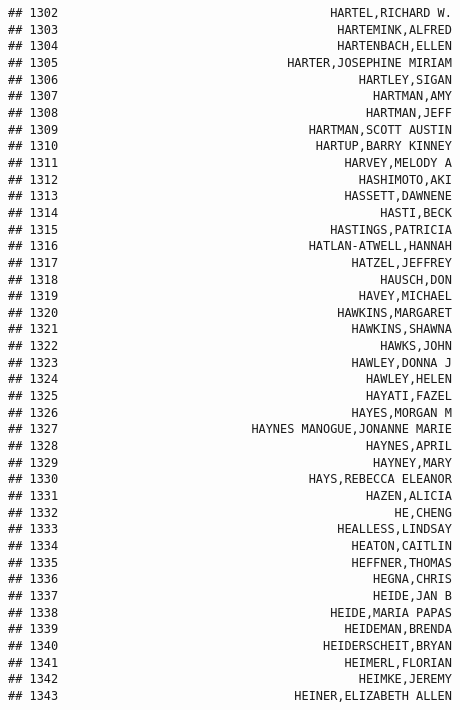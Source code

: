 \documentclass[
]{article}
\begin{document}
\begin{verbatim}
## 1302                                      HARTEL,RICHARD W.
## 1303                                       HARTEMINK,ALFRED
## 1304                                       HARTENBACH,ELLEN
## 1305                                HARTER,JOSEPHINE MIRIAM
## 1306                                          HARTLEY,SIGAN
## 1307                                            HARTMAN,AMY
## 1308                                           HARTMAN,JEFF
## 1309                                   HARTMAN,SCOTT AUSTIN
## 1310                                    HARTUP,BARRY KINNEY
## 1311                                        HARVEY,MELODY A
## 1312                                          HASHIMOTO,AKI
## 1313                                        HASSETT,DAWNENE
## 1314                                             HASTI,BECK
## 1315                                      HASTINGS,PATRICIA
## 1316                                   HATLAN-ATWELL,HANNAH
## 1317                                         HATZEL,JEFFREY
## 1318                                             HAUSCH,DON
## 1319                                          HAVEY,MICHAEL
## 1320                                       HAWKINS,MARGARET
## 1321                                         HAWKINS,SHAWNA
## 1322                                             HAWKS,JOHN
## 1323                                         HAWLEY,DONNA J
## 1324                                           HAWLEY,HELEN
## 1325                                           HAYATI,FAZEL
## 1326                                         HAYES,MORGAN M
## 1327                           HAYNES MANOGUE,JONANNE MARIE
## 1328                                           HAYNES,APRIL
## 1329                                            HAYNEY,MARY
## 1330                                   HAYS,REBECCA ELEANOR
## 1331                                           HAZEN,ALICIA
## 1332                                               HE,CHENG
## 1333                                       HEALLESS,LINDSAY
## 1334                                         HEATON,CAITLIN
## 1335                                         HEFFNER,THOMAS
## 1336                                            HEGNA,CHRIS
## 1337                                            HEIDE,JAN B
## 1338                                      HEIDE,MARIA PAPAS
## 1339                                        HEIDEMAN,BRENDA
## 1340                                     HEIDERSCHEIT,BRYAN
## 1341                                        HEIMERL,FLORIAN
## 1342                                          HEIMKE,JEREMY
## 1343                                 HEINER,ELIZABETH ALLEN

\end{verbatim}
\end{document}
